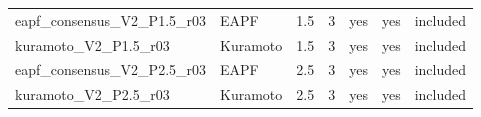\begin{table}[htbp]
\begin{tabular}{@{}p{4.55cm}p{2.1cm}rrlll@{}}
eapf\_\allowbreak{}consensus\_\allowbreak{}V2\_\allowbreak{}P1.5\_\allowbreak{}r03 & EAPF & 1.5 & 3 & yes & yes & included \\
kuramoto\_\allowbreak{}V2\_\allowbreak{}P1.5\_\allowbreak{}r03 & Kuramoto & 1.5 & 3 & yes & yes & included \\
eapf\_\allowbreak{}consensus\_\allowbreak{}V2\_\allowbreak{}P2.5\_\allowbreak{}r03 & EAPF & 2.5 & 3 & yes & yes & included \\
kuramoto\_\allowbreak{}V2\_\allowbreak{}P2.5\_\allowbreak{}r03 & Kuramoto & 2.5 & 3 & yes & yes & included \\
\bottomrule
\end{tabular}
\end{table}
